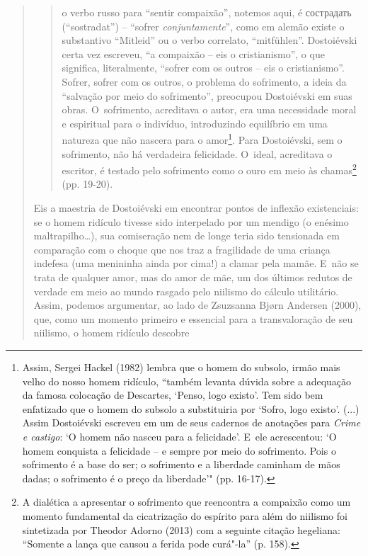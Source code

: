 {\begin{quote}
\begin{quote}
o verbo russo para ``sentir compaixão'', notemos aqui, é
сострадать
(``sostradat'') -- ``sofrer \emph{conjuntamente}'', como em alemão
existe o substantivo ``Mitleid'' ou o verbo correlato, ``mitfühlen''.
Dostoiévski certa vez escreveu, ``a compaixão -- eis o cristianismo'', o
que significa, literalmente, ``sofrer com os outros -- eis o
cristianismo''. Sofrer, sofrer com os outros, o problema do sofrimento,
a ideia da ``salvação por meio do sofrimento'', preocupou Dostoiévski em
suas obras. O~sofrimento, acreditava o autor, era uma necessidade moral
e espiritual para o indivíduo, introduzindo equilíbrio em uma natureza
que não nascera para o amor\footnote{Assim, Sergei Hackel (1982) lembra
  que o homem do subsolo, irmão mais velho do nosso homem ridículo,
  ``também levanta dúvida sobre a adequação da famosa colocação de
  Descartes, `Penso, logo existo'. Tem sido bem enfatizado que o homem
  do subsolo a substituiria por `Sofro, logo existo'. (...) Assim
  Dostoiévski escreveu em um de seus cadernos de anotações para
  \emph{Crime e castigo}: `O homem não nasceu para a felicidade'. E~ele
  acrescentou: `O homem conquista a felicidade -- e sempre por meio do
  sofrimento. Pois o sofrimento é a base do ser; o sofrimento e a
  liberdade caminham de mãos dadas; o sofrimento é o preço da
  liberdade'" (pp. 16-17).}. Para Dostoiévski, sem o sofrimento, não há
verdadeira felicidade. O~ideal, acreditava o escritor, é testado pelo
sofrimento como o ouro em meio às chamas\footnote{A dialética a
  apresentar o sofrimento que reencontra a compaixão como um momento
  fundamental da cicatrização do espírito para além do niilismo foi
  sintetizada por Theodor Adorno (2013) com a seguinte citação
  hegeliana: ``Somente a lança que causou a ferida pode curá"-la'' (p.
  158).} (pp. 19-20).
\end{quote}

Eis a maestria de Dostoiévski em encontrar pontos de inflexão
existenciais: se o homem ridículo tivesse sido interpelado por um
mendigo (o enésimo maltrapilho\ldots{}), sua comiseração nem de longe
teria sido tensionada em comparação com o choque que nos traz a
fragilidade de uma criança indefesa (uma menininha ainda por cima!) a
clamar pela mamãe. E~não se trata de qualquer amor, mas do amor de mãe,
um dos últimos redutos de verdade em meio ao mundo rasgado pelo niilismo
do cálculo utilitário. Assim, podemos argumentar, ao lado de Zsuzsanna
Bjørn Andersen (2000), que, como um momento primeiro e essencial para a
transvaloração de seu niilismo, o homem ridículo descobre


\end{quote}}
